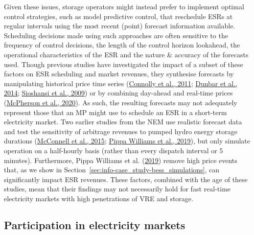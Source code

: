 \documentclass[12pt,a4paper,]{report}
\begin{document}
Given these issues, storage operators might instead prefer to implement
optimal control strategies, such as model predictive control, that
reschedule ESRs at regular intervals using the most recent (point)
forecast information available. Scheduling decisions made using such
approaches are often sensitive to the frequency of control decisions,
the length of the control horizon lookahead, the operational
characteristics of the ESR and the nature \& accuracy of the forecasts
used. Though previous studies have investigated the impact of a subset
of these factors on ESR scheduling and market revenues, they synthesise
forecasts by manipulating historical price time series
(\protect\hyperlink{ref-connollyPracticalOperationStrategies2011}{Connolly
et al., 2011};
\protect\hyperlink{ref-dunbarImpactElectricityPrice2014}{Dunbar et al.,
2014};
\protect\hyperlink{ref-sioshansiEstimatingValueElectricity2009}{Sioshansi
et al., 2009}) or by combining day-ahead and real-time prices
(\protect\hyperlink{ref-mcphersonImpactsStorageDispatch2020}{McPherson
et al., 2020}). As such, the resulting forecasts may not adequately
represent those that an MP might use to schedule an ESR in a short-term
electricity market. Two earlier studies from the NEM use realistic
forecast data and test the sensitivity of arbitrage revenues to pumped
hydro energy storage durations
(\protect\hyperlink{ref-mcconnellEstimatingValueElectricity2015}{McConnell
et al., 2015};
\protect\hyperlink{ref-pippawilliamsBatteryNationOperation2019}{Pippa
Williams et al., 2019}), but only simulate operation on a half-hourly
basis (rather than every dispatch interval or 5 minutes). Furthermore,
Pippa Williams et al.
(\protect\hyperlink{ref-pippawilliamsBatteryNationOperation2019}{2019})
remove high price events that, as we show in
Section~\ref{sec:info-case_study-bess_simulations}, can significantly
impact ESR revenues. These factors, combined with the age of these
studies, mean that their findings may not necessarily hold for fast
real-time electricity markets with high penetrations of VRE and storage.

\hypertarget{sec:info-context-esr-market_participation}{%
\subsection{Participation in electricity
markets}\label{sec:info-context-esr-market_participation}}
\end{document}

